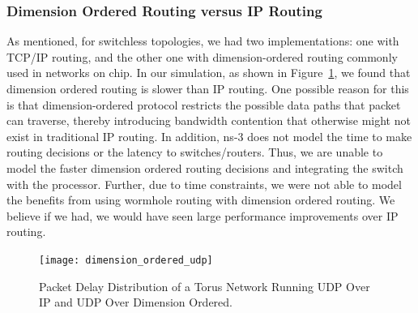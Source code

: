 


\subsubsection{Dimension Ordered Routing versus IP Routing}
As mentioned, for switchless topologies, we had two implementations: one with TCP/IP routing, and the other one with dimension-ordered routing commonly used in networks on chip. In our simulation, as shown in Figure~\ref{fig:dim_ordered}, we found that dimension ordered routing is slower than IP routing. One possible reason for this is that dimension-ordered protocol restricts the possible data paths that packet can traverse, thereby introducing bandwidth contention that otherwise might not exist in traditional IP routing.  In addition, ns-3 does not model the time to make routing decisions or the latency to switches/routers.  Thus, we are unable to model the faster dimension ordered routing decisions and integrating the switch with the processor.  Further, due to time constraints, we were not able to model the benefits from using wormhole routing with dimension ordered routing.  We believe if we had, we would have seen large performance improvements over IP routing.

\captionsetup[subfloat]{captionskip=-0.003in}
\begin{figure}
    \centering
    \texttt{[image: dimension\_ordered\_udp]}
    \vspace{-0.1in}
    \caption{Packet Delay Distribution of a Torus Network Running UDP Over IP and UDP Over Dimension Ordered.}
    \label{fig:dim_ordered}
    \vspace{-0.1in}
\end{figure}

